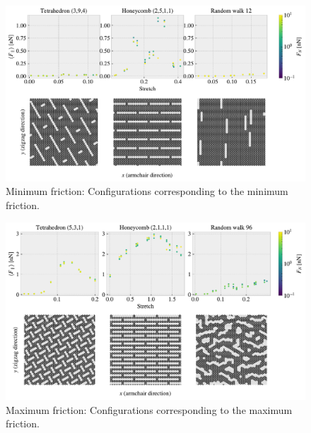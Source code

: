 

\begin{figure}[H]
  \centering
  \includegraphics[width=\linewidth]{figures/stretch_profiles/PP_min.pdf}
  \caption{Minimum friction: Configurations corresponding to the minimum friction.}
  \label{fig:PP_min}
\end{figure}


\begin{figure}[H]
  \centering
  \includegraphics[width=\linewidth]{figures/stretch_profiles/PP_max.pdf}
  \caption{Maximum friction: Configurations corresponding to the maximum friction.}
  \label{fig:PP_max}
\end{figure}



